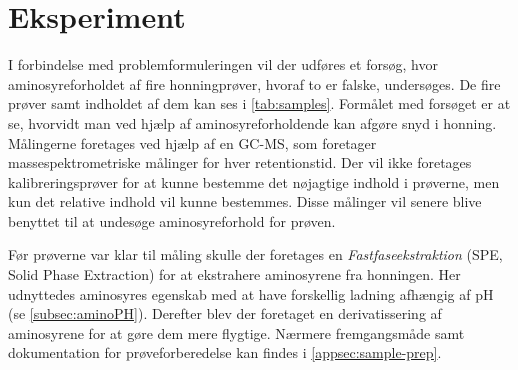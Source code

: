 \chapter{Eksperiment}
I forbindelse med problemformuleringen vil der udføres et forsøg, hvor aminosyreforholdet af fire honningprøver, hvoraf to er falske, undersøges.
De fire prøver samt indholdet af dem kan ses i \cref{tab:samples}.
Formålet med forsøget er at se, hvorvidt man ved hjælp af aminosyreforholdende kan afgøre snyd i honning.
Målingerne foretages ved hjælp af en GC-MS\footnotemark{}, som foretager massespektrometriske målinger for hver retentionstid.
Der vil ikke foretages kalibreringsprøver for at kunne bestemme det nøjagtige indhold i prøverne, men kun det relative indhold vil kunne bestemmes.
Disse målinger vil senere blive benyttet til at undesøge aminosyreforhold for prøven.

\par Før prøverne var klar til måling skulle der foretages en \emph{Fastfaseekstraktion} (SPE, Solid Phase Extraction) for at ekstrahere aminosyrene fra honningen.
Her udnyttedes aminosyres egenskab med at have forskellig ladning afhængig af pH (se \cref{subsec:aminoPH}).
Derefter blev der foretaget en derivatissering af aminosyrene for at gøre dem mere flygtige.
Nærmere fremgangsmåde samt dokumentation for prøveforberedelse kan findes i \cref{appsec:sample-prep}.
